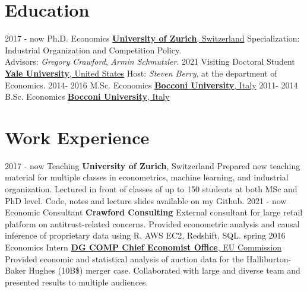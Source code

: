 \documentclass[a4paper]{mctemplate} %
\begin{document}

\begin{main}

\section{Education}

\begin{experiencelist} 
	\experienceitem
    	{2017 - now }
        {Ph.D. Economics}
        {\href{https://www.uzh.ch/en/}{\textbf{University of Zurich}, Switzerland}}
        {Specialization: Industrial Organization and Competition Policy. \\
         Advisors: \textit{Gregory Crawford}, \textit{Armin Schmutzler}.}
	\experienceitem
    	{2021}
        {Visiting Doctoral Student}
        {\href{https://www.yale.edu/}{\textbf{Yale University}, United States}}
        {Host: \textit{Steven Berry}, at the department of Economics.}
    \experienceitem
    	{2014- 2016}
        {M.Sc. Economics}
        {\href{https://www.unibocconi.eu/}{\textbf{Bocconi University}, Italy}}
        {}
    \experienceitem
    	{2011- 2014}
        {B.Sc. Economics}
        {\href{https://www.unibocconi.eu/}{\textbf{Bocconi University}, Italy}}
        {}
\end{experiencelist}


\section{Work Experience}

\begin{experiencelist}
    \experienceitem
    	{2017 - now}
        {Teaching}
        {\textbf{University of Zurich}, Switzerland}
        {Prepared new teaching material for multiple classes in econometrics, machine learning, and industrial organization. Lectured in front of classes of up to 150 students at both MSc and PhD level. Code, notes and lecture slides available on my Github.
        }
	\experienceitem
    	{2021 - now}
        {Economic Consultant}
        {\textbf{Crawford Consulting}}
        {External consultant for large retail platform on antitrust-related concerns. Provided econometric analysis and causal inference of proprietary data using R, AWS EC2, Redshift, SQL.
        }
    \experienceitem
    	{spring 2016}
        {Economics Intern}
        {\href{https://ec.europa.eu/competition-policy/chief-competition-economist_en}{\textbf{DG COMP Chief Economist Office}, EU Commission}}
        {Provided economic and statistical analysis of auction data for the Halliburton-Baker Hughes (10B\$) merger case. Collaborated with large and diverse team and presented results to multiple audiences.
        }
\end{experiencelist}


\end{main}
\end{document}
